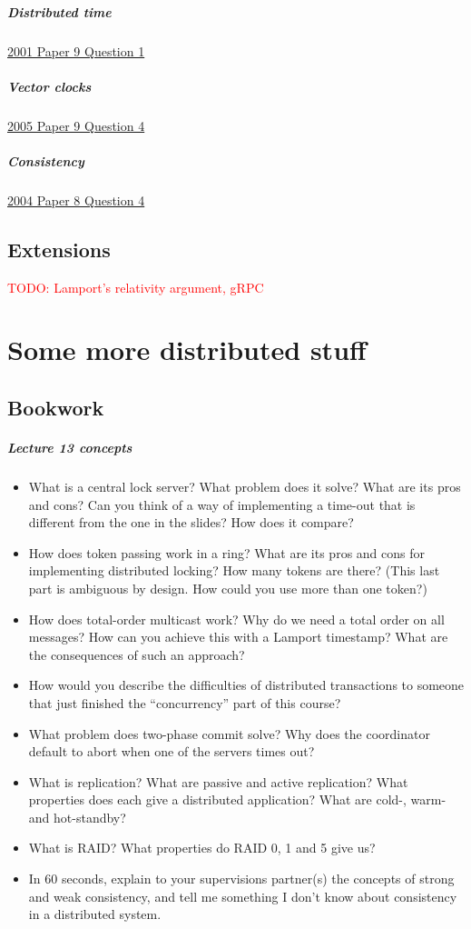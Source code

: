 \documentclass[12pt,a4paper,oneside,openright]{report}
\newcommand{\question}[2]{\paragraph{#1} #2}
\newcommand{\todo}[1]{\textcolor{red}{TODO: #1}}
\begin{document}
\question{Distributed
  time}{\href{https://www.cl.cam.ac.uk/teaching/exams/pastpapers/y2001p9q1.pdf}{2001
    Paper 9 Question 1}}

\question{Vector
  clocks}{\href{https://www.cl.cam.ac.uk/teaching/exams/pastpapers/y2005p9q4.pdf}{2005
    Paper 9 Question 4}}

\question{Consistency}{\href{https://www.cl.cam.ac.uk/teaching/exams/pastpapers/y2004p8q4.pdf}{2004
    Paper 8 Question 4}}

\section{Extensions}

\todo{Lamport's relativity argument, gRPC}

\chapter{Some more distributed stuff}

\section{Bookwork}

\question{Lecture 13 concepts}{
  \begin{itemize}
  \item What is a central lock server? What problem does it solve?
    What are its pros and cons? Can you think of a way of implementing
    a time-out that is different from the one in the slides? How does
    it compare?
  \item How does token passing work in a ring? What are its pros and
    cons for implementing distributed locking? How many tokens are
    there? (This last part is ambiguous by design. How could you use
    more than one token?)
  \item How does total-order multicast work? Why do we need a total
    order on all messages? How can you achieve this with a Lamport
    timestamp? What are the consequences of such an approach?
  \item How would you describe the difficulties of distributed
    transactions to someone that just finished the ``concurrency''
    part of this course?
  \item What problem does two-phase commit solve? Why does the
    coordinator default to abort when one of the servers times out?
  \item What is replication? What are passive and active replication?
    What properties does each give a distributed application? What are
    cold-, warm- and hot-standby?
  \item What is RAID? What properties do RAID 0, 1 and 5 give us?
  \item In 60 seconds, explain to your supervisions partner(s) the
    concepts of strong and weak consistency, and tell me something I
    don't know about consistency in a distributed system.
  \end{itemize}
}
\end{document}
